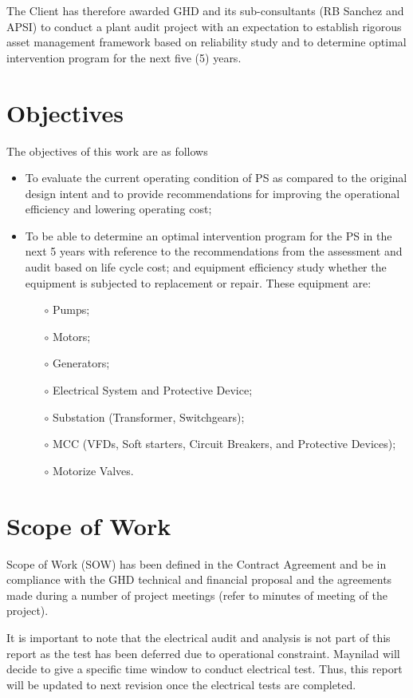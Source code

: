 The Client has therefore awarded GHD and its sub-consultants (RB Sanchez and APSI) to conduct a plant audit project with an expectation to establish rigorous asset management framework based on reliability study and to determine optimal intervention program for the next five (5) years.

\section{Objectives}
The objectives of this work are as follows
\begin{itemize}
	\item To evaluate the current operating condition of PS as compared to the original design intent and to provide recommendations for improving the operational efficiency and lowering operating cost;
	\item To be able to determine an optimal intervention program for the PS in the next 5 years with reference to the recommendations from the assessment and audit based on life cycle cost; and equipment efficiency study whether the equipment is subjected to replacement or repair. These equipment are:
	\begin{itemize}
		\item[$\circ$] Pumps;
		\item[$\circ$] Motors;
		\item[$\circ$] Generators;
		\item[$\circ$] Electrical System and Protective Device;
		\item[$\circ$] Substation (Transformer, Switchgears);
		\item[$\circ$] MCC (VFDs, Soft starters, Circuit Breakers, and Protective Devices);
		\item[$\circ$] Motorize Valves.	
	\end{itemize}
\end{itemize}

\section{Scope of Work}
Scope of Work (SOW) has been defined in the Contract Agreement and be in compliance with the GHD technical and financial proposal and the agreements made during a number of project meetings (refer to minutes of meeting of the project). 

{\color{red}
It is important to note that the electrical audit and analysis is not part of this report as the test has been deferred due to operational constraint. Maynilad will decide to give a specific time window to conduct electrical test. Thus, this report will be updated to next revision once the electrical tests are completed. 
}


